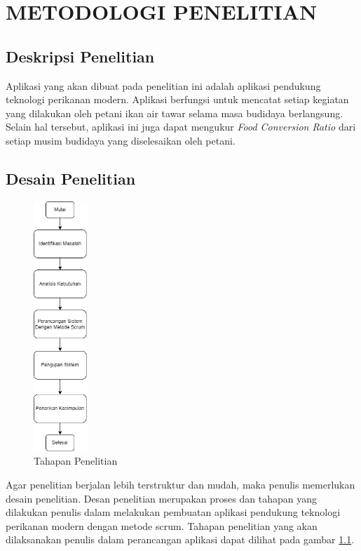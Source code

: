 
\chapter{METODOLOGI PENELITIAN}

\section{Deskripsi Penelitian}

Aplikasi yang akan dibuat pada penelitian ini adalah aplikasi pendukung teknologi perikanan modern. Aplikasi berfungsi untuk mencatat setiap kegiatan yang dilakukan oleh petani ikan air tawar selama masa budidaya berlangsung. Selain hal tersebut, aplikasi ini juga dapat mengukur \textit{Food Conversion Ratio} dari setiap musim budidaya yang diselesaikan oleh petani. 

\section{Desain Penelitian}

\begin{figure}[H]
	\centering
	\includegraphics[keepaspectratio, width=2cm]{gambar/tahapan}
	\caption{Tahapan Penelitian}
	\label{gambar:tahapan}
\end{figure}

Agar penelitian berjalan lebih terstruktur dan mudah, maka penulis memerlukan desain penelitian. Desan penelitian merupakan proses dan tahapan yang dilakukan penulis dalam melakukan pembuatan aplikasi pendukung teknologi perikanan modern dengan metode scrum. 
Tahapan penelitian yang akan dilaksanakan penulis dalam perancangan aplikasi dapat dilihat pada gambar \ref{gambar:tahapan}.

